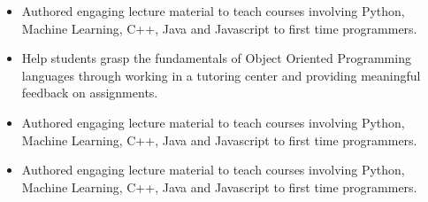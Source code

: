 \documentclass[10pt,a4paper,ragged2e]{altacv}
\begin{document}
\begin{itemize}
    \item Authored engaging lecture material to teach courses involving Python, Machine Learning, C++, Java and Javascript to first time programmers. 
\end{itemize}

\vspace{10px}

\begin{itemize}
    \item Help students grasp the fundamentals of Object Oriented Programming languages through working in a tutoring center and providing meaningful feedback on assignments.
\end{itemize}


\begin{itemize}
  \item Authored engaging lecture material to teach courses involving Python, Machine Learning, C++, Java and Javascript to first time programmers. 
\end{itemize}

\vspace{10px}

\begin{itemize}
  \item Authored engaging lecture material to teach courses involving Python, Machine Learning, C++, Java and Javascript to first time programmers. 
\end{itemize}
\end{document}
